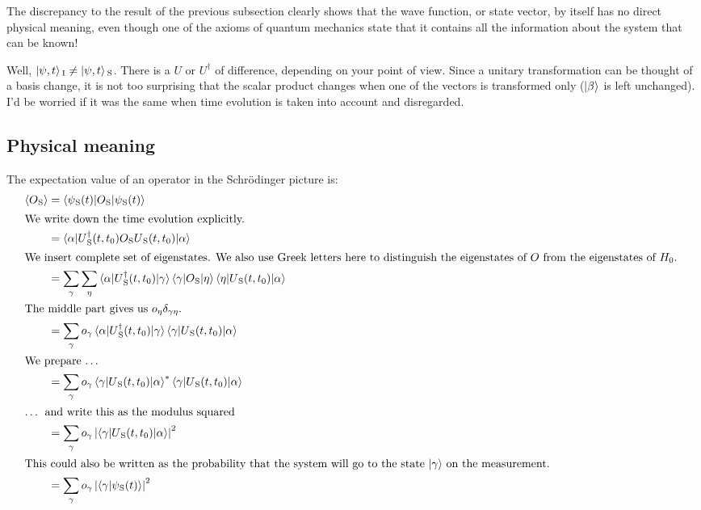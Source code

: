 \documentclass[11pt, english, fleqn, DIV=15, headinclude, BCOR=1.5cm]{scrartcl}
\begin{document}
\begin{problem}
    The discrepancy to the result of the previous subsection clearly shows that
    the wave function, or state vector, by itself has no direct physical
    meaning, even though one of the axioms of quantum mechanics state that it
    contains all the information about the system that can be known!
\end{problem}

Well, $\ket{\psi, t}{}_\text I \neq \ket{\psi, t}{}_\text S$. There is a $U$ or $U^\dagger$
of difference, depending on your point of view. Since a unitary transformation
can be thought of a basis change, it is not too surprising that the scalar
product changes when one of the vectors is transformed only ($\ket\beta$ is
left unchanged). I'd be worried if it was the same when time evolution is taken
into account and disregarded.

\subsection{Physical meaning}

The expectation value of an operator in the Schrödinger picture is:
\begin{align*}
    \bracket{O\SP}
    &= \braket{\psi\SP(t) | O\SP | \psi\SP(t)} \\
    \intertext{%
        We write down the time evolution explicitly.
    }
    &= \braket{\alpha | U\SP^\dagger(t, t_0) O\SP U\SP(t, t_0)| \alpha} \\
    \intertext{%
        We insert complete set of eigenstates. We also use Greek letters here
        to distinguish the eigenstates of $O$ from the eigenstates of $H_0$.
    }
    &= \sum_\gamma \sum_\eta \braket{\alpha | U\SP^\dagger(t, t_0) | \gamma}
    \braket{\gamma | O\SP | \eta} \braket{\eta | U\SP(t, t_0)| \alpha} \\
    \intertext{%
        The middle part gives us $o_\eta \delta_{\gamma\eta}$.
    }
    &= \sum_\gamma o_\gamma \braket{\alpha | U\SP^\dagger(t, t_0) | \gamma}
    \braket{\gamma | U\SP(t, t_0)| \alpha} \\
    \intertext{%
        We prepare …
    }
    &= \sum_\gamma o_\gamma \braket{\gamma | U\SP(t, t_0) | \alpha}^*
    \braket{\gamma | U\SP(t, t_0)| \alpha} \\
    \intertext{%
        … and write this as the modulus squared
    }
    &= \sum_\gamma o_\gamma \abs{\braket{\gamma | U\SP(t, t_0)| \alpha}}^2 \\
    \intertext{%
        This could also be written as the probability that the system will go
        to the state $\ket\gamma$ on the measurement.
    }
    &= \sum_\gamma o_\gamma \abs{\braket{\gamma | \psi\SP(t)}}^2
\end{align*}
\end{document}
